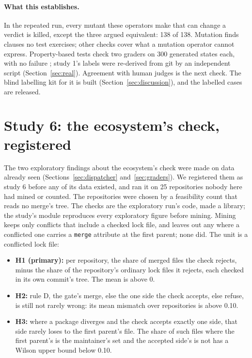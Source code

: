 \documentclass[11pt]{article}
\newcommand{\code}[1]{\texttt{#1}}
\begin{document}
\paragraph{What this establishes.}
In the repeated run, every mutant these operators make that can change a verdict is killed, except
the three argued equivalent: 138 of 138. Mutation finds clauses no test exercises; other checks
cover what a mutation operator cannot express. Property-based tests check two graders on 300
generated states each, with no failure \cite{maciver2019hypothesis}; study 1's labels were
re-derived from git by an independent script (Section~\ref{sec:real}). Agreement with human
judges is the next check. The blind labelling kit for it is built (Section~\ref{sec:discussion}),
and the labelled cases are released.

\section{Study 6: the ecosystem's check, registered}
\label{sec:study6}

The two exploratory findings about the ecosystem's check were made on data already seen
(Sections~\ref{sec:dispatcher} and~\ref{sec:graders}). We registered them as study 6 before any
of its data existed, and ran it on 25 repositories nobody here had mined or counted. The
repositories were chosen by a feasibility count that reads no merge's tree. The checks are the
exploratory run's code, made a library; the study's module reproduces every exploratory figure
before mining. Mining keeps only conflicts that include a checked lock file, and leaves out
any where a conflicted one carries a \code{merge} attribute at the first parent; none did. The
unit is a conflicted lock file:
\begin{itemize}
  \item \textbf{H1 (primary):} per repository, the share of merged files the check rejects,
  minus the share of the repository's ordinary lock files it rejects, each checked in its own
  commit's tree. The mean is above 0.
  \item \textbf{H2:} rule D, the gate's merge, else the one side the check accepts, else refuse,
  is still not rarely wrong: its mean mismatch over repositories is above 0.10.
  \item \textbf{H3:} where a package diverges and the check accepts exactly one side, that side
  rarely loses to the first parent's file. The share of such files where the first parent's is
  the maintainer's set and the accepted side's is not has a Wilson upper bound below 0.10.
\end{itemize}
\end{document}
